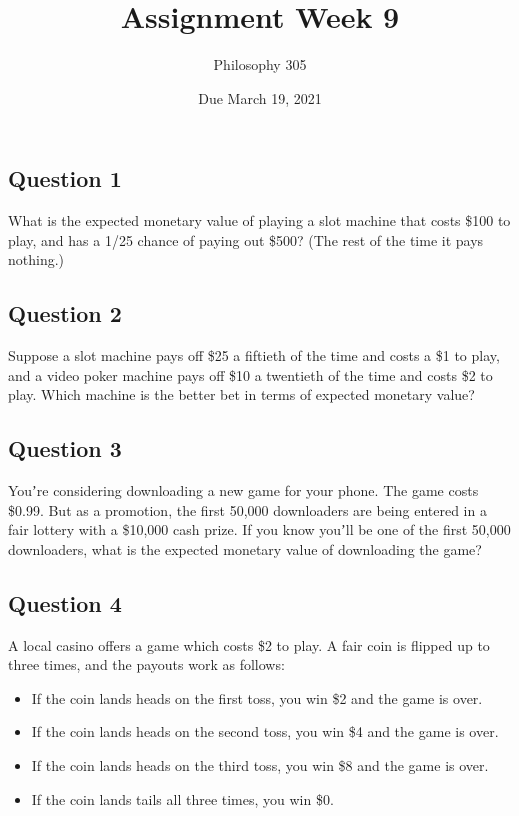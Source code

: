 \documentclass[
  11pt,
]{article}
\title{Assignment Week 9}
\author{Philosophy 305}
\date{Due March 19, 2021}
\providecommand{\tightlist}{%
  \setlength{\itemsep}{0pt}\setlength{\parskip}{0pt}}
\begin{document}
\maketitle

\hypertarget{question-1}{%
\subsection{Question 1}\label{question-1}}

What is the expected monetary value of playing a slot machine that costs
\$100 to play, and has a 1/25 chance of paying out \$500? (The rest of
the time it pays nothing.)

\hypertarget{question-2}{%
\subsection{Question 2}\label{question-2}}

Suppose a slot machine pays off \$25 a fiftieth of the time and costs a
\$1 to play, and a video poker machine pays off \$10 a twentieth of the
time and costs \$2 to play. Which machine is the better bet in terms of
expected monetary value?

\hypertarget{question-3}{%
\subsection{Question 3}\label{question-3}}

Youʼre considering downloading a new game for your phone. The game costs
\$0.99. But as a promotion, the first 50,000 downloaders are being
entered in a fair lottery with a \$10,000 cash prize. If you know youʼll
be one of the first 50,000 downloaders, what is the expected monetary
value of downloading the game?

\hypertarget{question-4}{%
\subsection{Question 4}\label{question-4}}

A local casino offers a game which costs \$2 to play. A fair coin is
flipped up to three times, and the payouts work as follows:

\begin{itemize}
\tightlist
\item
  If the coin lands heads on the first toss, you win \$2 and the game is
  over.
\item
  If the coin lands heads on the second toss, you win \$4 and the game
  is over.
\item
  If the coin lands heads on the third toss, you win \$8 and the game is
  over.
\item
  If the coin lands tails all three times, you win \$0.
\end{itemize}
\end{document}
